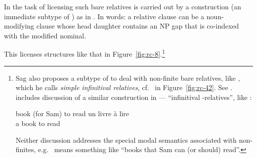 \documentclass[output=paper
 	        ,biblatex
                ,babelshorthands
                ,newtxmath
                ,draftmode
                ,colorlinks, citecolor=brown
]{langscibook}
\begin{document}
In \cite{Sag:97} the task of licensing such bare relatives is carried out by a construction (an
immediate subtype of ) as in . In words: a relative clause can be
a noun-modifying clause whose head daughter contains an NP gap that is co-indexed with the
modified nominal.
\begin{exe}\ex\label{x:rc-91}
\end{exe}
This licenses structures like that in Figure~\ref{fig:rc-8}.\footnote{Sag also proposes a
  subtype of  to deal with non-finite bare relatives, like , which he calls
  \emph{simple infinitival relatives}, cf.\  in
  Figure~\ref{fig:rc-42}. See \cite[469]{Sag:97}. \cite{AGMS98a} includes discussion of a
  similar construction in  --- ``infinitival -relatives'', like :
  \begin{exe}
    \ex\label{x:rc-92}book (for Sam) to read
    \ex\label{x:rc-93}\gll un livre \`{a} lire\\
            a book    to   read\\ 
  \end{exe}
  Neither discussion addresses the
  special modal semantics associated with non-finites, e.g.\ 
  means something like ``books that Sam can (or should) read''.} 
\end{document}

